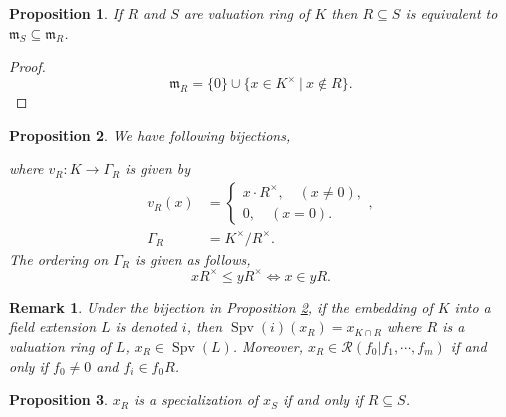 \documentclass[8pt]{article}
\numberwithin{equation}{section}
\newtheorem{proposition}{Proposition}[subsection]
\newtheorem{remark}{Remark}[subsection]
\DeclareMathOperator{\Spv}{Spv}
\newcommand{\m}[0]{\mathfrak{m}}
\newcommand{\cR}[0]{\mathcal{R}}
\newcommand{\sep}[0]{\:|\:}
\newcommand{\ab}[1]{\vert #1 \vert}
\begin{document}
\begin{proposition}
    \label{fact_7_2}
    If $R$ and $S$ are valuation ring of $K$ then $R\subseteq S$ is equivalent to $\m_S\subseteq\m_R$.
\end{proposition}
\begin{proof}
    \begin{equation*}
        \m_R=\{0\}\cup\{x\in K^\times\sep x\not\in R\}.
    \end{equation*}
\end{proof}
\begin{proposition}
    \label{proposition_7_1}
    We have following bijections,
    \begin{center}
    \end{center}
    where $v_R:K\to\Gamma_R$ is given by
    \begin{align*}
        v_R(x) &= \begin{cases}
            x\cdot R^\times ,\quad(x\not=0),\\
            0,\quad(x=0).
        \end{cases},\\
        \Gamma_R &= K^\times/R^\times.
    \end{align*}
    The ordering on $\Gamma_R$ is given as follows,
    \begin{equation*}
        xR^\times\leq yR^\times \iff x\in yR.
    \end{equation*}
\end{proposition}


\begin{remark}
    \label{fact_8_2}
    Under the bijection in Proposition \ref{proposition_7_1}, if the embedding of $K$ into a field extension $L$ is denoted $i$, then $\Spv(i)(x_R) = x_{K\cap R}$ where $R$ is a valuation ring of $L$, $x_R\in\Spv(L)$. Moreover, $x_R\in\cR(f_0|f_1,\cdots,f_m)$ if and only if $f_0\not=0$ and $f_i\in f_0R$. 
\end{remark}

\begin{proposition}
    \label{fact_8_3}
    $x_R$ is a specialization of $x_S$ if and only if $R\subseteq S$. 
\end{proposition}
\end{document}
